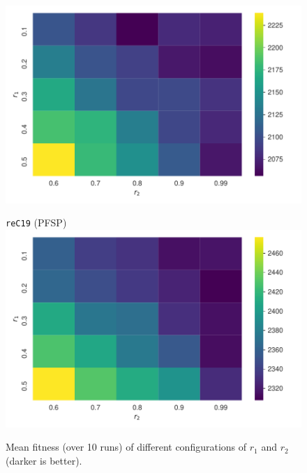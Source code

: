 \documentclass[sigconf,dvipsnames]{acmart}
\begin{document}
\begin{figure}[!tb]
\begin{minipage}{0.49\linewidth}
  \includegraphics[width=\textwidth]{../img/heatmap_pfsp_rec13_txt}
\end{minipage}
\begin{minipage}{0.49\linewidth}
  \centering
  \texttt{reC19} (PFSP)\\[-0.5ex]
  \includegraphics[width=\textwidth]{../img/heatmap_pfsp_rec19_txt}
\end{minipage}
\caption{Mean fitness (over 10 runs) of different configurations of $r_1$ and $r_2$ (darker is better).\label{fig:heatmaps}}
\end{figure}
\end{document}
